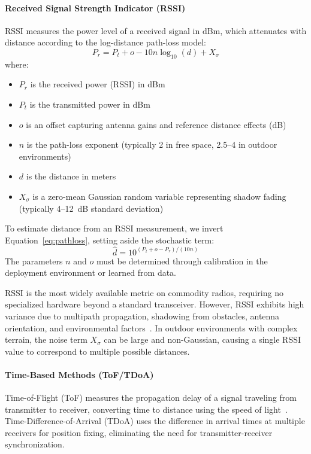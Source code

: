 \documentclass[master,final,11pt]{iscs-thesis}
\begin{document}
\paragraph{Received Signal Strength Indicator (RSSI)}
RSSI measures the power level of a received signal in dBm, which attenuates with distance according to the log-distance path-loss model:
\begin{equation}
    P_r = P_t + o - 10n\log_{10}(d) + X_\sigma
    \label{eq:pathloss}
\end{equation}
where:
\begin{itemize}
    \item $P_r$ is the received power (RSSI) in dBm
    \item $P_t$ is the transmitted power in dBm
    \item $o$ is an offset capturing antenna gains and reference distance effects (dB)
    \item $n$ is the path-loss exponent (typically 2 in free space, 2.5--4 in outdoor environments)
    \item $d$ is the distance in meters
    \item $X_\sigma$ is a zero-mean Gaussian random variable representing shadow fading (typically 4--12~dB standard deviation)
\end{itemize}

To estimate distance from an RSSI measurement, we invert Equation~\ref{eq:pathloss}, setting aside the stochastic term:
\begin{equation}
    \hat{d} = 10^{(P_t + o - P_r) / (10n)}
    \label{eq:rssi_to_dist}
\end{equation}
The parameters $n$ and $o$ must be determined through calibration in the deployment environment or learned from data.

RSSI is the most widely available metric on commodity radios, requiring no specialized hardware beyond a standard transceiver.
However, RSSI exhibits high variance due to multipath propagation, shadowing from obstacles, antenna orientation, and environmental factors~\cite{goldoni2019lora}.
In outdoor environments with complex terrain, the noise term $X_\sigma$ can be large and non-Gaussian, causing a single RSSI value to correspond to multiple possible distances.

\paragraph{Time-Based Methods (ToF/TDoA)}
Time-of-Flight (ToF) measures the propagation delay of a signal traveling from transmitter to receiver, converting time to distance using the speed of light~\cite{zafari2019survey}.
Time-Difference-of-Arrival (TDoA) uses the difference in arrival times at multiple receivers for position fixing, eliminating the need for transmitter-receiver synchronization.
\end{document}
